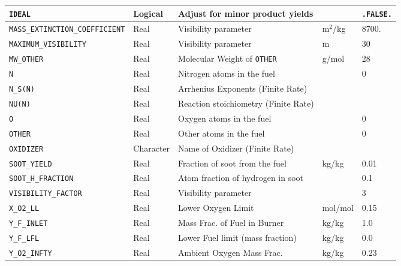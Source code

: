 \documentclass[11pt]{book}
\newcommand{\ct}{\tt\small}
\begin{document}
\begin{table}[H]
\begin{tabular*}{\textwidth}{@{\extracolsep{\fill}}|l|l|l|l|l|}
{\ct IDEAL}                               & Logical     & Adjust for minor product yields           &                   & {\ct .FALSE.}    \\ \hline
{\ct \tiny MASS\_EXTINCTION\_COEFFICIENT} & Real        & Visibility parameter                      &  m$^2$/kg         & 8700.    \\ \hline
{\ct MAXIMUM\_VISIBILITY}                 & Real        & Visibility parameter                      &  m                &     30   \\ \hline
{\ct MW\_OTHER}                           & Real        & Molecular Weight of {\ct OTHER}           &  g/mol            & 28      \\ \hline
{\ct N}                                   & Real        & Nitrogen atoms in the fuel                &                   & 0    \\ \hline
{\ct N\_S(N)}                             & Real        & Arrhenius Exponents (Finite Rate)         &                   &     \\ \hline
{\ct NU(N)}                               & Real        & Reaction stoichiometry (Finite Rate)      &                   &     \\ \hline
{\ct O}                                   & Real        & Oxygen atoms in the fuel                  &                   & 0    \\ \hline
{\ct OTHER}                               & Real        & Other atoms in the fuel                   &                   & 0    \\ \hline
{\ct OXIDIZER}                            & Character   & Name of Oxidizer (Finite Rate)            &                   &         \\ \hline
{\ct SOOT\_YIELD}                         & Real        & Fraction of soot from the fuel            & kg/kg             & 0.01    \\ \hline
{\ct SOOT\_H\_FRACTION}                   & Real        & Atom fraction of hydrogen in soot         &                   & 0.1    \\ \hline
{\ct VISIBILITY\_FACTOR}                  & Real        & Visibility parameter                      &                   &     3   \\ \hline
{\ct X\_O2\_LL}                           & Real        & Lower Oxygen Limit                        &  mol/mol          & 0.15    \\ \hline
{\ct Y\_F\_INLET}                         & Real        & Mass Frac. of Fuel in Burner              &  kg/kg            & 1.0     \\ \hline
{\ct Y\_F\_LFL}                           & Real        & Lower Fuel limit (mass fraction)          &  kg/kg            & 0.0     \\ \hline
{\ct Y\_O2\_INFTY}                        & Real        & Ambient Oxygen Mass Frac.                 &  kg/kg            & 0.23    \\ \hline
\end{tabular*}
\end{table}
\end{document}
